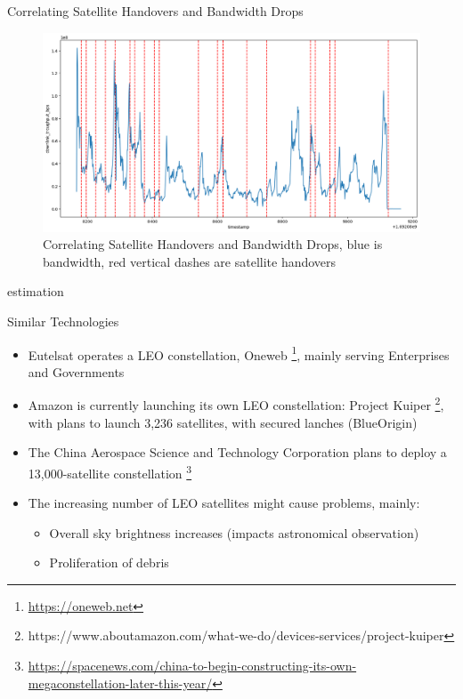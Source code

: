 \documentclass[NET,english,beameralt]{tumbeamer}
\begin{document}
\begin{frame}[fragile]{Correlating Satellite Handovers and Bandwidth Drops}
    \begin{figure}
        \includegraphics[width=0.8\columnwidth]{pics/correlation_handovers_bw.png}
        \caption{Correlating Satellite Handovers and Bandwidth Drops, blue is bandwidth, red vertical dashes are satellite handovers}
    \end{figure}
\end{frame}
estimation
\begin{frame}{Similar Technologies}
    \begin{itemize}
        \item Eutelsat operates a LEO constellation, Oneweb \footnote{\url{https://oneweb.net}}, mainly serving Enterprises and Governments
        \item Amazon is currently launching its own LEO constellation: Project Kuiper 
              \footnote{https://www.aboutamazon.com/what-we-do/devices-services/project-kuiper}, with plans to launch 3,236 satellites,
               with secured lanches (BlueOrigin)
        \item The China Aerospace Science and Technology Corporation plans to deploy a 13,000-satellite constellation
                \footnote{\url{https://spacenews.com/china-to-begin-constructing-its-own-megaconstellation-later-this-year/}}
        \item The increasing number of LEO satellites might cause problems, mainly:
        \begin{itemize}
            \item Overall sky brightness increases (impacts astronomical observation)
            \item Proliferation of debris
        \end{itemize}
    \end{itemize}
\end{frame}
\end{document}
